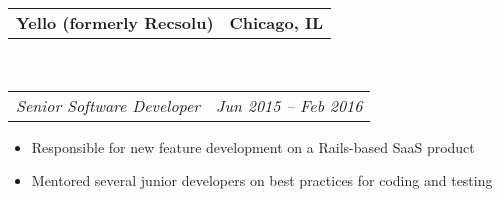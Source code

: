 \documentclass[10pt,letterpaper]{article}
\makeatletter
\newcommand{\headerrow}[2]
{\begin{tabular*}{\linewidth}{l@{\extracolsep{\fill}}r}
  #1 &
  #2 \\
\end{tabular*}}
\newenvironment{indentsection}[1]%
{\begin{list}{}%
  {\setlength{\leftmargin}{#1}}%
  \item[]%
}
{\end{list}}
\makeatother
\begin{document}
\begin{indentsection}{\parindent}
  \headerrow
    {\textbf{Yello (formerly Recsolu)} }
    {\textbf{Chicago, IL}}
  \\
  \headerrow
    {\emph{Senior Software Developer}}
    {\emph{Jun 2015 -- Feb 2016}}

  \begin{itemize}
  \renewcommand{\labelitemi}{$-$}
  \vspace{-0.1in}
    \item Responsible for new feature development on a Rails-based SaaS product
    \item Mentored several junior developers on best practices for coding and testing
  \end{itemize}
\end{indentsection}
\end{document}
